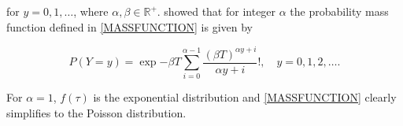 \documentclass[9pt,a5paper,]{book}
\begin{document}
for \(y = 0, 1, \ldots\), where \(\alpha, \beta \in \mathbb{R}^+\).
\citet{Winkelmann:1995} showed that for integer \(\alpha\) the
probability mass function defined in \ref{MASSFUNCTION} is given by

\begin{equation}
P(Y = y) = \exp{-\beta T} \sum_{i = 0}^{\alpha -1} \frac{(\beta T)^{\alpha y + i}}{\alpha y + i}! , \quad y = 0, 1, 2, \ldots .
\end{equation}

For \(\alpha = 1\), \(f(\tau)\) is the exponential distribution and
\ref{MASSFUNCTION} clearly simplifies to the Poisson distribution.


\end{document}
